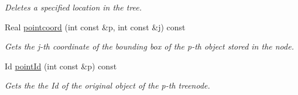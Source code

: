 \begin{DoxyCompactItemize}
\begin{DoxyCompactList}\small\item\em Deletes a specified location in the tree. \item\end{DoxyCompactList}\item 
\hypertarget{classADTree_a60abe007e7aac04363741888be4a43ad}{
Real \hyperlink{classADTree_a60abe007e7aac04363741888be4a43ad}{pointcoord} (int const \&p, int const \&j) const }
\label{classADTree_a60abe007e7aac04363741888be4a43ad}

\begin{DoxyCompactList}\small\item\em Gets the j-\/th coordinate of the bounding box of the p-\/th object stored in the node. \item\end{DoxyCompactList}\item 
\hypertarget{classADTree_a683ed97b493d79b3fca4a1666c15998a}{
Id \hyperlink{classADTree_a683ed97b493d79b3fca4a1666c15998a}{pointId} (int const \&p) const }
\label{classADTree_a683ed97b493d79b3fca4a1666c15998a}

\begin{DoxyCompactList}\small\item\em Gets the the Id of the original object of the p-\/th treenode. \item\end{DoxyCompactList}\end{DoxyCompactItemize}
